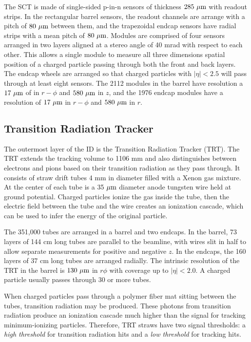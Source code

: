 The SCT is made of single-sided p-in-n sensors of thickness $285\ \mu \textrm{m}$ with readout strips. In the rectangular barrel sensors, the readout channels are arrange with a pitch of $80\ \mu \textrm{m}$ between them, and the trapezoidal endcap sensors have radial strips with a mean pitch of  $80\ \mu \textrm{m}$.  Modules are comprised of four sensors arranged in two layers aligned at a stereo angle of 40 mrad with respect to each other. This allows a single module to measure all three dimensions spatial position of a charged particle passing through both the front and back layers. The endcap wheels are arranged so that charged particles with $|\eta|<2.5$ will pass through at least eight sensors. The 2112 modules in the barrel have resolution a $17\ \mu \textrm{m}$ of in $r-\phi$ and $580\ \mu \textrm{m}$ in $z$, and the 1976 endcap modules have a resolution of $17\ \mu \textrm{m}$ in $r-\phi$ and $580\ \mu \textrm{m}$ in $r$.

\subsection{Transition Radiation Tracker}
The outermost layer of the ID is the Transition Radiation Tracker (TRT). The TRT extends the tracking volume to 1106 mm and also distinguishes between electrons and pions based on their transition radiation as they pass through. It consists of straw drift tubes 4 mm in diameter filled with a Xenon gas mixture. At the center of each tube is a 35 $\mu \textrm{m}$ diameter anode tungsten wire held at ground potential. Charged particles ionize the gas inside the tube, then the electric field between the tube and the wire creates an ionization cascade, which can be used to infer the energy of the original particle.

The 351,000 tubes are arranged in a barrel and two endcaps. In the barrel, 73 layers of 144 cm long tubes are parallel to the beamline, with wires slit in half to allow separate measurements for positive and negative $z$. In the endcaps, the 160 layers of 37 cm long tubes are arranged radially.  The intrinsic resolution of the TRT in the barrel is $130\ \mu \textrm{m}$ in $r\phi$ with coverage up to $|\eta|<2.0$. A charged particle usually passes through 30 or more tubes.

When charged particles pass through a polymer fiber mat sitting between the tubes, transition radiation may be produced. These photons from transition radiation produce an ionization cascade much higher than the signal for tracking minimum-ionizing particles. Therefore, TRT straws have two signal thresholds: a \emph{high threshold} for transition radiation hits and a \emph{low threshold} for tracking hits. 

